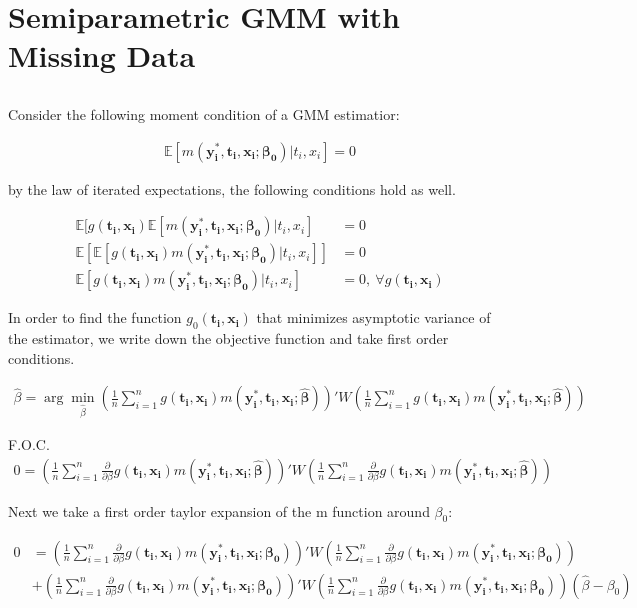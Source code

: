 \documentclass[12pt]{article}
\newcommand{\E}{\mathbb{E}}
\newcommand{\qsum}{\sum\limits_{i=1}^n}
\begin{document}
\newpage
\section{Semiparametric GMM with Missing Data}
\subsection{}
\subsubsection{}
Consider the following moment condition of a GMM estimatior:

\begin{align*}
  \E[m\mathbf{(y_i^*,t_i,x_i;\beta_0)}|t_i,x_i] = 0
\end{align*}

by the law of iterated expectations, the following conditions hold as well.

\begin{align*}
  \E[g\mathbf{(t_i,x_i)}\E[m\mathbf{(y_i^*,t_i,x_i;\beta_0)}|t_i,x_i] &= 0 \\
    \E[\E[g\mathbf{(t_i,x_i)}m\mathbf{(y_i^*,t_i,x_i;\beta_0)}|t_i,x_i]] &= 0 \\
      \E[g\mathbf{(t_i,x_i)}m\mathbf{(y_i^*,t_i,x_i;\beta_0)}|t_i,x_i] &= 0 , \ \forall g\mathbf{(t_i,x_i)}
\end{align*}

In order to find the function $g_0\mathbf{(t_i,x_i)}$ that minimizes asymptotic variance of the estimator, we write down the objective function and take first order conditions.


\begin{align*}
  \hat\beta = \arg \min_{\hat\beta} \left( \frac{1}{n} \qsum g\mathbf{(t_i,x_i)}m\mathbf{(y_i^*,t_i,x_i;\hat\beta)} \right)' W \left( \frac{1}{n} \qsum g\mathbf{(t_i,x_i)}m\mathbf{(y_i^*,t_i,x_i;\hat\beta)} \right)
\end{align*}

F.O.C.
\begin{align*}
  0 = \left( \frac{1}{n} \qsum \frac{\partial}{\partial\beta} g\mathbf{(t_i,x_i)}m\mathbf{(y_i^*,t_i,x_i;\hat\beta)} \right)' W \left( \frac{1}{n} \qsum \frac{\partial}{\partial\beta} g\mathbf{(t_i,x_i)}m\mathbf{(y_i^*,t_i,x_i;\hat\beta)} \right)
\end{align*}


Next we take a first order taylor expansion of the m function around $\beta_0$:

\begin{align*}
  0 &= \left( \frac{1}{n} \qsum \frac{\partial}{\partial\beta} g\mathbf{(t_i,x_i)}m\mathbf{(y_i^*,t_i,x_i;\beta_0)} \right)' W \left( \frac{1}{n} \qsum \frac{\partial}{\partial\beta} g\mathbf{(t_i,x_i)}m\mathbf{(y_i^*,t_i,x_i;\beta_0)} \right)\\
  & + \left( \frac{1}{n} \qsum \frac{\partial}{\partial\beta} g\mathbf{(t_i,x_i)}m\mathbf{(y_i^*,t_i,x_i;\beta_0)} \right)' W \left( \frac{1}{n} \qsum \frac{\partial}{\partial\beta} g\mathbf{(t_i,x_i)}m\mathbf{(y_i^*,t_i,x_i;\beta_0)} \right)(\hat\beta-\beta_0)
\end{align*}
\end{document}
